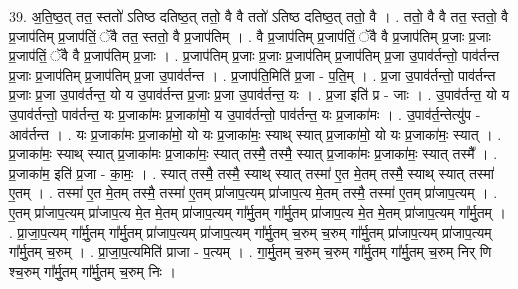 \documentclass[17pt]{extarticle}
\begin{document}
39. अ॒ति॒ष्ठ॒त् तत॒ स्ततो॑ ऽतिष्ठ दतिष्ठ॒त् ततो॒ वै वै ततो॑ ऽतिष्ठ दतिष्ठ॒त् ततो॒ वै । . ततो॒ वै वै तत॒ स्ततो॒ वै प्र॒जाप॑तिम् प्र॒जाप॑तिं॒ ॅवै तत॒ स्ततो॒ वै प्र॒जाप॑तिम् । . वै प्र॒जाप॑तिम् प्र॒जाप॑तिं॒ ॅवै वै प्र॒जाप॑तिम् प्र॒जाः प्र॒जाः प्र॒जाप॑तिं॒ ॅवै वै प्र॒जाप॑तिम् प्र॒जाः । . प्र॒जाप॑तिम् प्र॒जाः प्र॒जाः प्र॒जाप॑तिम् प्र॒जाप॑तिम् प्र॒जा उ॒पाव॑र्तन्तो॒ पाव॑र्तन्त प्र॒जाः प्र॒जाप॑तिम् प्र॒जाप॑तिम् प्र॒जा उ॒पाव॑र्तन्त । . प्र॒जाप॑ति॒मिति॑ प्र॒जा - प॒ति॒म् । . प्र॒जा उ॒पाव॑र्तन्तो॒ पाव॑र्तन्त प्र॒जाः प्र॒जा उ॒पाव॑र्तन्त॒ यो य उ॒पाव॑र्तन्त प्र॒जाः प्र॒जा उ॒पाव॑र्तन्त॒ यः । . प्र॒जा इति॑ प्र - जाः । . उ॒पाव॑र्तन्त॒ यो य उ॒पाव॑र्तन्तो॒ पाव॑र्तन्त॒ यः प्र॒जाका॑मः प्र॒जाका॑मो॒ य उ॒पाव॑र्तन्तो॒ पाव॑र्तन्त॒ यः प्र॒जाका॑मः । . उ॒पाव॑र्त॒न्तेत्यु॑प - आव॑र्तन्त । . यः प्र॒जाका॑मः प्र॒जाका॑मो॒ यो यः प्र॒जाका॑मः॒ स्याथ् स्यात् प्र॒जाका॑मो॒ यो यः प्र॒जाका॑मः॒ स्यात् । . प्र॒जाका॑मः॒ स्याथ् स्यात् प्र॒जाका॑मः प्र॒जाका॑मः॒ स्यात् तस्मै॒ तस्मै॒ स्यात् प्र॒जाका॑मः प्र॒जाका॑मः॒ स्यात् तस्मै᳚ । . प्र॒जाका॑म॒ इति॑ प्र॒जा - का॒मः॒ । . स्यात् तस्मै॒ तस्मै॒ स्याथ् स्यात् तस्मा॑ ए॒त मे॒तम् तस्मै॒ स्याथ् स्यात् तस्मा॑ ए॒तम् । . तस्मा॑ ए॒त मे॒तम् तस्मै॒ तस्मा॑ ए॒तम् प्रा॑जाप॒त्यम् प्रा॑जाप॒त्य मे॒तम् तस्मै॒ तस्मा॑ ए॒तम् प्रा॑जाप॒त्यम् । . ए॒तम् प्रा॑जाप॒त्यम् प्रा॑जाप॒त्य मे॒त मे॒तम् प्रा॑जाप॒त्यम् गा᳚र्मु॒तम् गा᳚र्मु॒तम् प्रा॑जाप॒त्य मे॒त मे॒तम् प्रा॑जाप॒त्यम् गा᳚र्मु॒तम् । . प्रा॒जा॒प॒त्यम् गा᳚र्मु॒तम् गा᳚र्मु॒तम् प्रा॑जाप॒त्यम् प्रा॑जाप॒त्यम् गा᳚र्मु॒तम् च॒रुम् च॒रुम् गा᳚र्मु॒तम् प्रा॑जाप॒त्यम् प्रा॑जाप॒त्यम् गा᳚र्मु॒तम् च॒रुम् । . प्रा॒जा॒प॒त्यमिति॑ प्राजा - प॒त्यम् । . गा॒र्मु॒तम् च॒रुम् च॒रुम् गा᳚र्मु॒तम् गा᳚र्मु॒तम् च॒रुम् निर् णि श्च॒रुम् गा᳚र्मु॒तम् गा᳚र्मु॒तम् च॒रुम् निः । \newline
\end{document}
